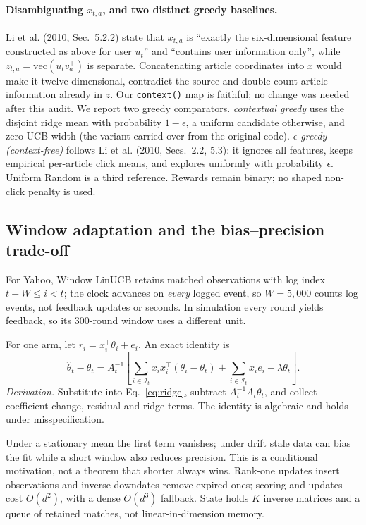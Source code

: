 \documentclass[10pt,a4paper]{article}
\begin{document}
\paragraph{Disambiguating $x_{t,a}$, and two distinct greedy baselines.}
Li et al. (2010, Sec.~5.2.2) state that $x_{t,a}$ is ``exactly the
six-dimensional feature constructed as above for user $u_t$'' and
``contains user information only'', while $z_{t,a}=\mathrm{vec}(u_t
v_a^\top)$ is separate. Concatenating article coordinates into $x$ would
make it twelve-dimensional, contradict the source and double-count article
information already in $z$. Our \texttt{context()} map is faithful; no
change was needed after this audit. We report two greedy comparators.
\emph{contextual greedy} uses the disjoint ridge mean with probability
$1-\epsilon$, a uniform candidate otherwise, and zero UCB width (the
variant carried over from the original code). \emph{$\epsilon$-greedy
(context-free)} follows Li et al. (2010, Secs.~2.2, 5.3): it ignores all
features, keeps empirical per-article click means, and explores uniformly
with probability $\epsilon$. Uniform Random is a third reference. Rewards
remain binary; no shaped non-click penalty is used.

\subsection{Window adaptation and the bias--precision trade-off}
For Yahoo, Window LinUCB retains matched observations with log index
$t-W\le i<t$; the clock advances on \emph{every} logged event, so
$W=5{,}000$ counts log events, not feedback updates or seconds. In
simulation every round yields feedback, so its 300-round window uses a
different unit.

For one arm, let $r_i=x_i^\top\theta_i+e_i$. An exact identity is
\begin{equation}
\hat\theta_t-\theta_t=A_t^{-1}\left[
\sum_{i\in\mathcal I_t}x_ix_i^\top(\theta_i-\theta_t)
+\sum_{i\in\mathcal I_t}x_ie_i-\lambda\theta_t\right].
\label{eq:drift}
\end{equation}
\emph{Derivation.} Substitute into Eq.~\eqref{eq:ridge}, subtract
$A_t^{-1}A_t\theta_t$, and collect coefficient-change, residual and ridge
terms. The identity is algebraic and holds under misspecification.

Under a stationary mean the first term vanishes; under drift stale data
can bias the fit while a short window also reduces precision. This is a
conditional motivation, not a theorem that shorter always wins. Rank-one
updates insert observations and inverse downdates remove expired ones;
scoring and updates cost $O(d^2)$, with a dense $O(d^3)$ fallback. State
holds $K$ inverse matrices and a queue of retained matches, not
linear-in-dimension memory.
\end{document}
